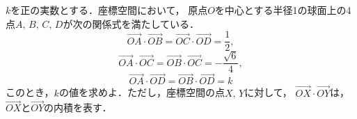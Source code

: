 \documentclass[../../main.tex]{subfiles}
\begin{document}
$k$を正の実数とする．座標空間において，
原点$O$を中心とする半径1の球面上の4点$A, \, B, \, C, \, D$が次の関係式を満たしている．
\[ \overrightarrow{OA}\cdot\overrightarrow{OB}=\overrightarrow{OC}\cdot\overrightarrow{OD}=\frac{1}{2}, \]
\[ \overrightarrow{OA}\cdot\overrightarrow{OC}=\overrightarrow{OB}\cdot\overrightarrow{OC}=
-\frac{\sqrt6}{4}, \]
\[ \overrightarrow{OA}\cdot\overrightarrow{OD}=\overrightarrow{OB}\cdot\overrightarrow{OD}=k \]
このとき，$k$の値を求めよ．ただし，座標空間の点$X, \, Y$に対して，
$\overrightarrow{OX}\cdot\overrightarrow{OY}$は，
$\overrightarrow{OX}$と$\overrightarrow{OY}$の内積を表す．
\end{document}

